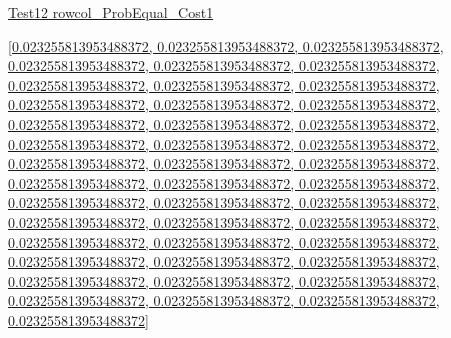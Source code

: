 \documentclass[12pt]{article}
\begin{document}
\noindent \url{Test12 rowcol_ProbEqual_Cost1}

\noindent \url{[0.023255813953488372, 0.023255813953488372, 0.023255813953488372, 0.023255813953488372, 0.023255813953488372, 0.023255813953488372, 0.023255813953488372, 0.023255813953488372, 0.023255813953488372, 0.023255813953488372, 0.023255813953488372, 0.023255813953488372, 0.023255813953488372, 0.023255813953488372, 0.023255813953488372, 0.023255813953488372, 0.023255813953488372, 0.023255813953488372, 0.023255813953488372, 0.023255813953488372, 0.023255813953488372, 0.023255813953488372, 0.023255813953488372, 0.023255813953488372, 0.023255813953488372, 0.023255813953488372, 0.023255813953488372, 0.023255813953488372, 0.023255813953488372, 0.023255813953488372, 0.023255813953488372, 0.023255813953488372, 0.023255813953488372, 0.023255813953488372, 0.023255813953488372, 0.023255813953488372, 0.023255813953488372, 0.023255813953488372, 0.023255813953488372, 0.023255813953488372, 0.023255813953488372, 0.023255813953488372, 0.023255813953488372]}
\end{document}
